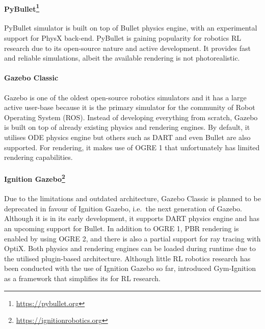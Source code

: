 \paragraph{PyBullet\protect\footnote{\href{https://pybullet.org}{https://pybullet.org}}} PyBullet simulator is built on top of Bullet physics engine, with an experimental support for PhysX back-end. PyBullet is gaining popularity for robotics RL research due to its open-source nature and active development. It provides fast and reliable simulations, albeit the available rendering is not photorealistic.

\paragraph{Gazebo Classic~\protect\cite{koenig_design_2004}} Gazebo is one of the oldest open-source robotics simulators and it has a large active user-base because it is the primary simulator for the community of Robot Operating System (ROS). Instead of developing everything from scratch, Gazebo is built on top of already existing physics and rendering engines. By default, it utilises ODE physics engine but others such as DART and even Bullet are also supported. For rendering, it makes use of OGRE 1 that unfortunately has limited rendering capabilities.

\paragraph{Ignition Gazebo\protect\footnote{\href{https://ignitionrobotics.org}{https://ignitionrobotics.org}}} Due to the limitations and outdated architecture, Gazebo Classic is planned to be deprecated in favour of Ignition Gazebo, i.e.~the next generation of Gazebo. Although it is in its early development, it supports DART physics engine and has an upcoming support for Bullet. In addition to OGRE 1, PBR rendering is enabled by using OGRE 2, and there is also a partial support for ray tracing with OptiX. Both physics and rendering engines can be loaded during runtime due to the utilised plugin-based architecture. Although little RL robotics research has been conducted with the use of Ignition Gazebo so far, \citet{ferigo_gym-ignition_2020} introduced Gym-Ignition as a framework that simplifies its for RL research.

